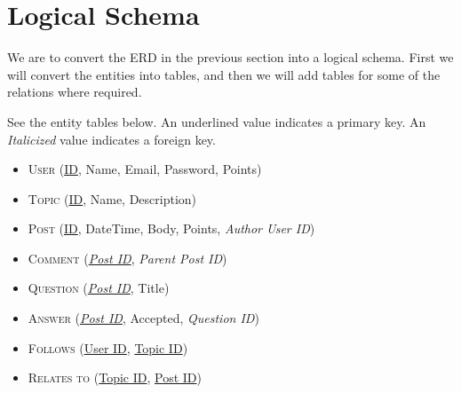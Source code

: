\newcommand{\key}[1]{\underline{#1}}
\newcommand{\fkey}[1]{\textit{#1}}

\section{Logical Schema}

We are to convert the ERD in the previous section into a logical schema. First we will convert the entities into tables, and then we will add tables for some of the relations where required.

See the entity tables below. An underlined value indicates a primary key. An \emph{Italicized} value indicates a foreign key.

\begin{itemize}
    \item[] \textsc{User} (\key{ID}, Name, Email, Password, Points)
    \item[] \textsc{Topic} (\key{ID}, Name, Description)
    \item[] \textsc{Post} (\key{ID}, DateTime, Body, Points, \fkey{Author User ID})
    \item[] \textsc{Comment} (\key{\fkey{Post ID}}, \fkey{Parent Post ID})
    \item[] \textsc{Question} (\key{\fkey{Post ID}}, Title)
    \item[] \textsc{Answer} (\key{\fkey{Post ID}}, Accepted, \fkey{Question ID})
    \item[] \textsc{Follows} (\key{User ID}, \key{Topic ID})
    \item[] \textsc{Relates to} (\key{Topic ID}, \key{Post ID})
\end{itemize}